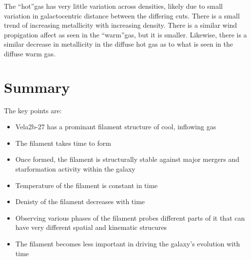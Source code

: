 \documentclass{article}
\newcommand{\warm}{``warm''}
\newcommand{\hot}{``hot''}
\begin{document}
The \hot gas has very little variation across densities, likely due to small
variation in galactocentric distance between the differing cuts. There is a small
trend of increasing metallicity with increasing density. There is a similar wind
propigation affect as seen in the \warm gas, but it is smaller. Likewise, there
is a similar decrease in metallicity in the diffuse hot gas as to what is seen in
the diffuse warm gas. 







\section{Summary}

The key points are:
\begin{itemize}
\item Vela2b-27 has a prominant filament structure of cool, inflowing gas
\item The filament takes time to form
\item Once formed, the filament is structurally stable against major mergers and
starformation activity within the galaxy
\item Temperature of the filament is constant in time
\item Denisty of the filament decreases with time
\item Observing various phases of the filament probes different parts of it that
can have very different spatial and kinematic strucures
\item The filament becomes less important in driving the galaxy's evolution with
time
\end{itemize}
\end{document}
